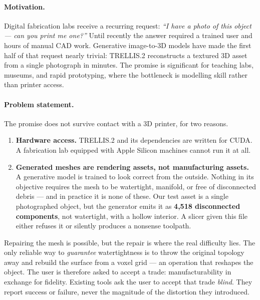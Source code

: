 \documentclass[11pt,a4paper]{article}
\begin{document}
\paragraph{Motivation.}
Digital fabrication labs receive a recurring request: \emph{``I have a photo of
this object --- can you print me one?''} Until recently the answer required a
trained user and hours of manual CAD work. Generative image-to-3D models have
made the first half of that request nearly trivial: TRELLIS.2
\cite{xiang2025trellis2} reconstructs a textured 3D asset from a single
photograph in minutes. The promise is significant for teaching labs, museums,
and rapid prototyping, where the bottleneck is modelling skill rather than
printer access.

\paragraph{Problem statement.}
The promise does not survive contact with a 3D printer, for two reasons.

\begin{enumerate}[leftmargin=*]
  \item \textbf{Hardware access.} TRELLIS.2 and its dependencies are written
        for CUDA. A fabrication lab equipped with Apple Silicon machines
        cannot run it at all.
  \item \textbf{Generated meshes are rendering assets, not manufacturing
        assets.} A generative model is trained to look correct from the
        outside. Nothing in its objective requires the mesh to be watertight,
        manifold, or free of disconnected debris --- and in practice it is
        none of these. Our test asset is a single photographed object, but
        the generator emits it as \textbf{4{,}518 disconnected components},
        not watertight, with a hollow interior. A slicer given this file
        either refuses it or silently produces a nonsense toolpath.
\end{enumerate}

Repairing the mesh is possible, but the repair is where the real difficulty
lies. The only reliable way to \emph{guarantee} watertightness is to throw the
original topology away and rebuild the surface from a voxel grid --- an
operation that reshapes the object. The user is therefore asked to accept a
trade: manufacturability in exchange for fidelity. Existing tools ask the user
to accept that trade \emph{blind}. They report success or failure, never the
magnitude of the distortion they introduced.
\end{document}
